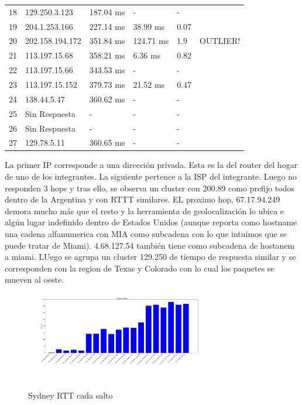 \begin{tabular}{ |p{1cm}||p{3cm}|p{2cm}|p{2cm}|p{2cm}|p{1.5cm}|  }
18  & 129.250.3.123  & 187.04 ms &   -          &      -        & \\ 
19  & 204.1.253.166  & 227.14 ms &   38.99 ms    &     0.07      & \\ 
20  & 202.158.194.172 & 351.84 ms &    124.71 ms   &     1.9       &        OUTLIER! \\
21  & 113.197.15.68   & 358.21 ms  &    6.36 ms     &     0.82      & \\
22 &   113.197.15.66  & 343.53 ms &     -          &      -        & \\ 
23  & 113.197.15.152  & 379.73 ms &    21.52 ms    &     0.47      & \\ 
24  & 138.44.5.47     & 360.62 ms &    -          &      -         & \\ 
25 &  Sin Respuesta   &  -   &      -        &       -        & \\ 
26 &  Sin Respuesta   &  -  &       -        &      -        & \\ 
27 &  129.78.5.11  &     360.65 ms  &    -         &       -          & \\
 \hline
\end{tabular}

\smallskip

La primer IP corresponde a una dirección privada. Esta es la del router del hogar de uno de los integrantes. La siguiente pertence a la ISP del integrante. Luego no responden 3 hops y tras ello, se observa un cluster con 200.89 como prefijo todos dentro de la Argentina y con RTTT similares.
EL proximo hop, 67.17.94.249 demora mucho más que el resto y la herramienta de geolocalización lo ubica e algún lugar indefinido dentro de Estados Unidos (aunque reporta como hostname una cadena alfanumerica con MIA como subcadena con lo que intuimos que se puede tratar de Miami). 4.68.127.54 también tiene como subcadena de hostanem a miami. LUego se agrupa un cluster 129.250 de tiempo de respuesta similar y se corresponden con la region de Texas y Colorado con lo cual los paquetes se mueven al oeste.\\

\begin{figure}[H]
\centering
\caption{Sydney RTT cada salto}
\includegraphics[width=0.7\textwidth]{modules/asia_rtt}
 \label{fig:dysney_rtts}
\end{figure}

